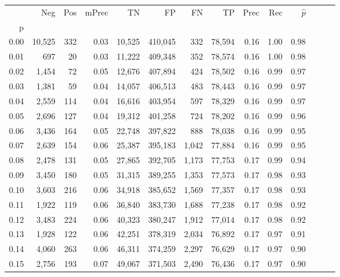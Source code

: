 \begin{tabular}{rrrrrrrrrrrrrr}
\toprule
{} &     Neg &    Pos & mPrec &       TN &       FP &      FN &      TP &  Prec &   Rec & $\hat{p}$ \\
p    &         &        &       &          &          &         &         &       &       &           \\
\midrule
0.00 &  10,525 &    332 &  0.03 &   10,525 &  410,045 &     332 &  78,594 &  0.16 &  1.00 &      0.98 \\
0.01 &     697 &     20 &  0.03 &   11,222 &  409,348 &     352 &  78,574 &  0.16 &  1.00 &      0.98 \\
0.02 &   1,454 &     72 &  0.05 &   12,676 &  407,894 &     424 &  78,502 &  0.16 &  0.99 &      0.97 \\
0.03 &   1,381 &     59 &  0.04 &   14,057 &  406,513 &     483 &  78,443 &  0.16 &  0.99 &      0.97 \\
0.04 &   2,559 &    114 &  0.04 &   16,616 &  403,954 &     597 &  78,329 &  0.16 &  0.99 &      0.97 \\
0.05 &   2,696 &    127 &  0.04 &   19,312 &  401,258 &     724 &  78,202 &  0.16 &  0.99 &      0.96 \\
0.06 &   3,436 &    164 &  0.05 &   22,748 &  397,822 &     888 &  78,038 &  0.16 &  0.99 &      0.95 \\
0.07 &   2,639 &    154 &  0.06 &   25,387 &  395,183 &   1,042 &  77,884 &  0.16 &  0.99 &      0.95 \\
0.08 &   2,478 &    131 &  0.05 &   27,865 &  392,705 &   1,173 &  77,753 &  0.17 &  0.99 &      0.94 \\
0.09 &   3,450 &    180 &  0.05 &   31,315 &  389,255 &   1,353 &  77,573 &  0.17 &  0.98 &      0.93 \\
0.10 &   3,603 &    216 &  0.06 &   34,918 &  385,652 &   1,569 &  77,357 &  0.17 &  0.98 &      0.93 \\
0.11 &   1,922 &    119 &  0.06 &   36,840 &  383,730 &   1,688 &  77,238 &  0.17 &  0.98 &      0.92 \\
0.12 &   3,483 &    224 &  0.06 &   40,323 &  380,247 &   1,912 &  77,014 &  0.17 &  0.98 &      0.92 \\
0.13 &   1,928 &    122 &  0.06 &   42,251 &  378,319 &   2,034 &  76,892 &  0.17 &  0.97 &      0.91 \\
0.14 &   4,060 &    263 &  0.06 &   46,311 &  374,259 &   2,297 &  76,629 &  0.17 &  0.97 &      0.90 \\
0.15 &   2,756 &    193 &  0.07 &   49,067 &  371,503 &   2,490 &  76,436 &  0.17 &  0.97 &      0.90 \\

\end{tabular}
